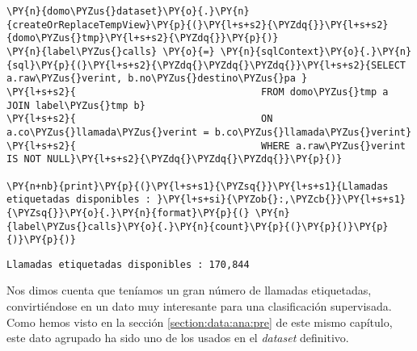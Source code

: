 \vspace{0.5cm}
    \begin{tcolorbox}[breakable, size=fbox, boxrule=1pt, pad at break*=1mm,colback=cellbackground, colframe=cellborder]
\begin{Verbatim}[commandchars=\\\{\}]
\PY{n}{domo\PYZus{}dataset}\PY{o}{.}\PY{n}{createOrReplaceTempView}\PY{p}{(}\PY{l+s+s2}{\PYZdq{}}\PY{l+s+s2}{domo\PYZus{}tmp}\PY{l+s+s2}{\PYZdq{}}\PY{p}{)}
\PY{n}{label\PYZus{}calls} \PY{o}{=} \PY{n}{sqlContext}\PY{o}{.}\PY{n}{sql}\PY{p}{(}\PY{l+s+s2}{\PYZdq{}\PYZdq{}\PYZdq{}}\PY{l+s+s2}{SELECT a.raw\PYZus{}verint, b.no\PYZus{}destino\PYZus{}pa }
\PY{l+s+s2}{                                FROM domo\PYZus{}tmp a JOIN label\PYZus{}tmp b}
\PY{l+s+s2}{                                ON a.co\PYZus{}llamada\PYZus{}verint = b.co\PYZus{}llamada\PYZus{}verint}
\PY{l+s+s2}{                                WHERE a.raw\PYZus{}verint IS NOT NULL}\PY{l+s+s2}{\PYZdq{}\PYZdq{}\PYZdq{}}\PY{p}{)}

\PY{n+nb}{print}\PY{p}{(}\PY{l+s+s1}{\PYZsq{}}\PY{l+s+s1}{Llamadas etiquetadas disponibles : }\PY{l+s+si}{\PYZob{}:,\PYZcb{}}\PY{l+s+s1}{\PYZsq{}}\PY{o}{.}\PY{n}{format}\PY{p}{(} \PY{n}{label\PYZus{}calls}\PY{o}{.}\PY{n}{count}\PY{p}{(}\PY{p}{)}\PY{p}{)}\PY{p}{)}  
\end{Verbatim}
\end{tcolorbox}

    \begin{Verbatim}[commandchars=\\\{\}]
Llamadas etiquetadas disponibles : 170,844
    \end{Verbatim}

 Nos dimos cuenta que teníamos un gran número de llamadas etiquetadas, convirtiéndose en un dato muy interesante para una clasificación supervisada. Como hemos visto en la sección \ref{section:data:ana:pre} de este mismo capítulo, este dato agrupado ha sido uno de los usados en el \textit{dataset} definitivo.
 
 
 
